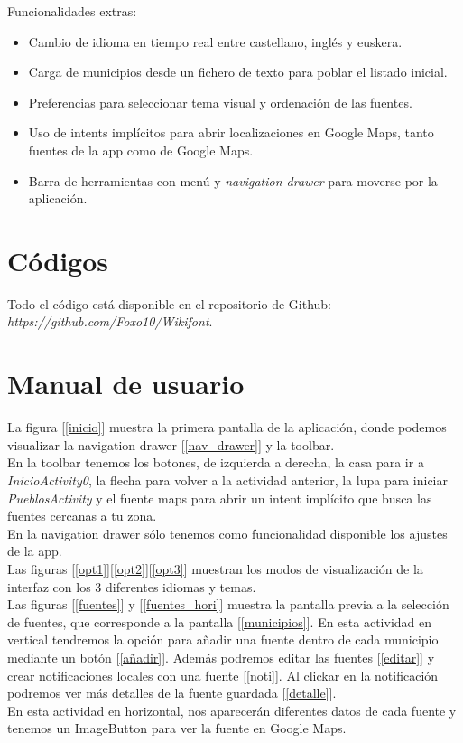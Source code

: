 \documentclass[11pt,a4paper]{article}
\begin{document}
	
    Funcionalidades extras:\\
    
\begin{itemize}
  \item Cambio de idioma en tiempo real entre castellano, inglés y euskera.
  \item Carga de municipios desde un fichero de texto para poblar el listado inicial.
  \item Preferencias para seleccionar tema visual y ordenación de las fuentes.
  \item Uso de intents implícitos para abrir localizaciones en Google Maps, tanto fuentes de la app como de Google Maps.
  \item Barra de herramientas con menú y \textit{navigation drawer} para moverse por la aplicación.
\end{itemize}


\section{Códigos}

Todo el código está disponible en el repositorio de Github: \\ \textit{https://github.com/Foxo10/Wikifont}.



\section{Manual de usuario}

	La figura [\ref{inicio}] muestra la primera pantalla de la aplicación, donde podemos visualizar la navigation drawer [\ref{nav_drawer}] y la toolbar. \\
    En la toolbar tenemos los botones, de izquierda a derecha, la casa para ir a \textit{InicioActivity0}, la flecha para volver a la actividad anterior, la lupa para iniciar \textit{PueblosActivity} y el fuente maps para abrir un intent implícito que busca las fuentes cercanas a tu zona. \\
    En la navigation drawer sólo tenemos como funcionalidad disponible los ajustes de la app.\\

    Las figuras [\ref{opt1}][\ref{opt2}][\ref{opt3}] muestran los modos de visualización de la interfaz con los 3 diferentes idiomas y temas. \\
    
    Las figuras [\ref{fuentes}] y [\ref{fuentes_hori}] muestra la pantalla previa a la selección de fuentes, que corresponde a la pantalla [\ref{municipios}]. En esta actividad en vertical tendremos la opción para añadir una fuente dentro de cada municipio mediante un botón [\ref{añadir}]. Además podremos editar las fuentes [\ref{editar}] y crear notificaciones locales con una fuente [\ref{noti}]. Al clickar en la notificación podremos ver más detalles de la fuente guardada [\ref{detalle}]. \\
    En esta actividad en horizontal, nos aparecerán diferentes datos de cada fuente y tenemos un ImageButton para ver la fuente en Google Maps.\\
\end{document}
